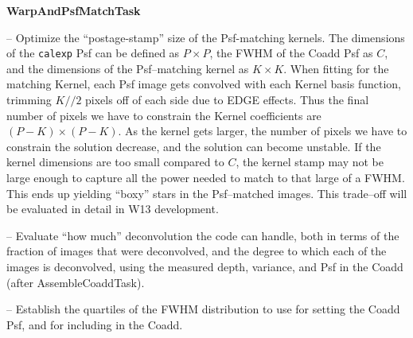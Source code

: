 \documentclass[prd, nofootinbib, floatfix, 11pt,tightenlines,times]{article}
\begin{document}
{\bf WarpAndPsfMatchTask}

-- Optimize the ``postage-stamp'' size of the Psf-matching kernels.
The dimensions of the {\tt calexp} Psf can be defined as $P \times P$,
the FWHM of the Coadd Psf as $C$, and the dimensions of the
Psf--matching kernel as $K \times K$.  When fitting for the matching
Kernel, each Psf image gets convolved with each Kernel basis function,
trimming $K//2$ pixels off of each side due to EDGE effects.  Thus the
final number of pixels we have to constrain the Kernel coefficients
are $(P-K) \times (P-K)$.  As the kernel gets larger, the number of
pixels we have to constrain the solution decrease, and the solution
can become unstable.  If the kernel dimensions are too small compared
to $C$, the kernel stamp may not be large enough to capture all the
power needed to match to that large of a FWHM.  This ends up yielding
``boxy'' stars in the Psf--matched images.  
This trade--off will be evaluated in detail in W13 development.





-- Evaluate ``how much'' deconvolution the code can handle, both in
terms of the fraction of images that were deconvolved, and the degree
to which each of the images is deconvolved, using the measured depth,
variance, and Psf in the Coadd (after AssembleCoaddTask).

-- Establish the quartiles of the FWHM distribution to use for setting
the Coadd Psf, and for including in the Coadd.
\end{document}
